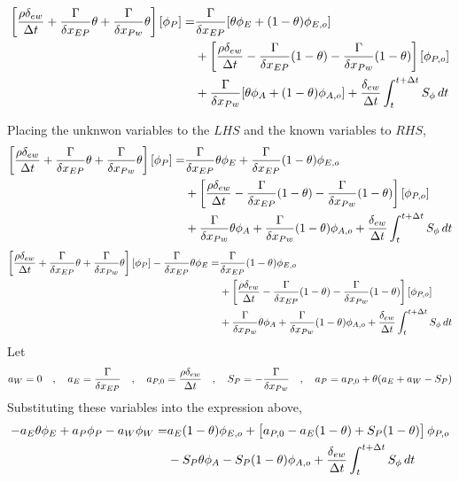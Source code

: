 \documentclass[a4paper, 12pt]{report}
\begin{document}
\begin{center}
\begin{equation*}
\begin{split}
\left[\frac{\rho\delta_{ew}}{\Delta t} + \frac{\Gamma}{\delta x_{EP}}\theta + \frac{\Gamma}{\delta x_{Pw}}\theta\right][\phi_{P}] = & \frac{\Gamma }{\delta x_{EP}}[\theta\phi_{E} + (1-\theta)\phi_{E,o}]\\ & +\left[\frac{\rho\delta_{ew}}{\Delta t} - \frac{\Gamma }{\delta x_{EP}}(1-\theta) - \frac{\Gamma }{\delta x_{Pw}}(1-\theta)\right][\phi_{P,o}] \\ &  + \frac{\Gamma }{\delta x_{Pw}}[\theta\phi_{A} + (1-\theta)\phi_{A,o}] + \frac{\delta_{ew}}{\Delta t}\int^{t+\Delta t}_{t} S_\phi\,dt 
\end{split}
\end{equation*}

Placing the unknwon variables to the $LHS$ and the known variables to $RHS$,
\begin{equation*}
\begin{split}
\left[\frac{\rho\delta_{ew}}{\Delta t} + \frac{\Gamma}{\delta x_{EP}}\theta + \frac{\Gamma}{\delta x_{Pw}}\theta\right][\phi_{P}] = & \frac{\Gamma }{\delta x_{EP}}\theta\phi_{E} + \frac{\Gamma }{\delta x_{EP}}(1-\theta)\phi_{E,o}\\ & +\left[\frac{\rho\delta_{ew}}{\Delta t} - \frac{\Gamma }{\delta x_{EP}}(1-\theta) - \frac{\Gamma }{\delta x_{Pw}}(1-\theta)\right][\phi_{P,o}] \\ &  + \frac{\Gamma }{\delta x_{Pw}}\theta\phi_{A} + \frac{\Gamma }{\delta x_{Pw}}(1-\theta)\phi_{A,o} + \frac{\delta_{ew}}{\Delta t}\int^{t+\Delta t}_{t} S_\phi\,dt 
\end{split}
\end{equation*}
\begin{equation*}
\begin{split}
\left[\frac{\rho\delta_{ew}}{\Delta t} + \frac{\Gamma}{\delta x_{EP}}\theta + \frac{\Gamma}{\delta x_{Pw}}\theta\right][\phi_{P}]  -\frac{\Gamma }{\delta x_{EP}}\theta\phi_{E} = &\frac{\Gamma }{\delta x_{EP}}(1-\theta)\phi_{E,o}\\ & +\left[\frac{\rho\delta_{ew}}{\Delta t} - \frac{\Gamma }{\delta x_{EP}}(1-\theta) - \frac{\Gamma }{\delta x_{Pw}}(1-\theta)\right][\phi_{P,o}] \\ &  + \frac{\Gamma }{\delta x_{Pw}}\theta\phi_{A} + \frac{\Gamma }{\delta x_{Pw}}(1-\theta)\phi_{A,o} + \frac{\delta_{ew}}{\Delta t}\int^{t+\Delta t}_{t} S_\phi\,dt 
\end{split}
\end{equation*}
Let
$$a_W = 0 \quad,\quad a_E = \frac{\Gamma}{\delta x_{EP}} \quad,\quad a_{P,0} = \frac{\rho\delta_{ew}}{\Delta t} \quad,\quad S_P = -\frac{\Gamma}{\delta x_{Pw}} \quad,\quad a_{P} = a_{P,0} + \theta(a_E + a_W - S_P)$$
Substituting these variables into the expression above,
\begin{equation*}
\begin{split}
 - a_E\theta\phi_{E} + a_P\phi_{P} - a_W\phi_W = & a_E(1-\theta)\phi_{E,o} +\left[a_{P,0} - a_E(1-\theta) + S_P(1-\theta)\right]\phi_{P,o} \\ &  - S_P\theta\phi_{A} - S_P(1-\theta)\phi_{A,o} + \frac{\delta_{ew}}{\Delta t}\int^{t+\Delta t}_{t} S_\phi\,dt 
\end{split}
\end{equation*}



\end{center}
\end{document}
